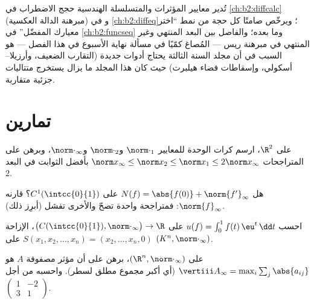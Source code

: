 \begin{remark}
تُدير معايير المؤثرات والمتسلسلة الهندسية حجج الاضطراب
في \cref{ch:b2:diffcalc} (مبرهنة الدالة العكسية) و
 في \cref{ch:b2:diffeq}؛ ويرخّص  صامتًا كل حجة من نمط ``اختر معيارك المفضّل''
في \cref{ch:b2:funcseq} وما بعده؛ والفاصل بين
البعد المنتهي وغير المنتهي في مبرهنة ريس --- المُصاغ كمّيًا في
مسألة نهاية الأسبوع في هذا الفصل --- هو السبب في أن مجلد السنة
الثالثة يحتاج أدوات جديدة (التقارب الضعيف، وأرزيلا--أسكولي،
وإسقاطات فضاء هيلبرت) حيث كان هذا المجلد ما يزال يستخرج
متتاليات جزئية متقاربة.
\end{remark}

\section{تمارين}

\begin{exercise}[$\star$]\label{exo:b2:nvs:1}
على $\R^2$، ارسم كرات الوحدة للمعايير $\norm\cdot_1$ و$\norm\cdot_2$
و$\norm\cdot_\infty$، وبرهن على المتراجحات $\norm x_\infty
\leq \norm x_2 \leq \norm x_1 \leq 2\norm x_\infty$ بأفضل
الثوابت في البعد $2$.
\end{exercise}

\begin{exercise}[$\star$]\label{exo:b2:nvs:2}
هل $N(f) = \abs{f(0)} + \norm{f'}_\infty$  على
$C^1(\intcc{0}{1})$؟ قارنه  $\norm{f}_\infty$: فمتراجحة واحدة
تصحّ والأخرى تفشل (أبرِز ذلك).
\end{exercise}

\begin{exercise}[$\star$]\label{exo:b2:nvs:3}
احسب  $u(f) = \int_0^1 f(t)\,\eu^t\,\dd t$
على $\bigl(C(\intcc{0}{1}), \norm\cdot_\infty\bigr) \to \R$، 
الإزاحة $S(x_1, x_2, \dots, x_n) = (x_2, \dots, x_n, 0)$ على
$(K^n, \norm\cdot_\infty)$.
\end{exercise}

\begin{exercise}[$\star\star$]\label{exo:b2:nvs:4}
على $(\R^n, \norm\cdot_\infty)$، برهن على أن  مؤثر
مصفوفة $A$ هو $\vertiii A_\infty = \max_i \sum_j \abs{a_{ij}}$ (أي أكبر
مجموع مطلق لسطر). واحسبه من أجل $\begin{pmatrix} 1 & -2\\
3 & 1\end{pmatrix}$.
\end{exercise}

